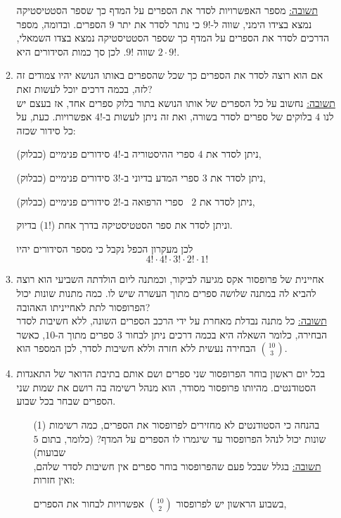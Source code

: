 \documentclass[12pt, a4paper]{article}
\begin{document}
\begin{enumerate}
\begin{enumerate}
\underline{תשובה:}
מספר האפשרויות לסדר את הספרים על המדף כך שספר הסטטיסטיקה נמצא בצידו הימני, שווה ל-$9!$
כי נותר לסדר את יתר 
$9$
הספרים.
ובדומה, מספר הדרכים לסדר את הספרים על המדף כך שספר הסטטיסטיקה נמצא בצדו השמאלי, שווה
$9!$.
לכן סך כמות הסידורים היא
$\boxed{2\cdot 9!}$.
\\
\item
אם הוא רוצה לסדר את הספרים כך שכל שהספרים באותו הנושא יהיו צמודים זה לזה, בכמה דרכים יוכל לעשות זאת?
\\

\underline{תשובה:}
נחשוב על כל הספרים של אותו הנושא בתור בלוק ספרים אחד, אז בעצם יש לנו 
$4$
בלוקים של ספרים לסדר בשורה, ואת זה ניתן לעשות ב-$4!$
אפשרויות.
כעת, על כל סידור שכזה: 

ניתן לסדר את
$4$
ספרי ההיסטוריה ב-$4!$
סידורים פנימיים (כבלוק),

ניתן לסדר את
$3$
ספרי המדע בדיוני ב-$3!$
סידורים פנימיים (כבלוק),

ניתן לסדר את
$2$
 ספרי הרפואה ב-$2!$
 סידורים פנימיים (כבלוק),
 
 וניתן לסדר את ספר הסטטיסטיקה בדרך אחת ($1!$) בדיוק.

 לכן מעקרון הכפל נקבל כי מספר הסידורים יהיו
 $$\boxed{4! \cdot 4!\cdot 3!\cdot 2!\cdot 1!}$$
 
\item
אחיינית של פרופסור אקס מגיעה לביקור, וכמתנה ליום הולדתה השביעי הוא רוצה להביא לה במתנה
שלושה
ספרים מתוך העשרה שיש לו. כמה מתנות שונות יכול הפרופסור לתת לאחייניתו האהובה?
\\

\underline{תשובה:}
כל מתנה נבדלת מאחרת על ידי הרכב הספרים השונה, ללא חשיבות לסדר הבחירה, כלומר השאלה היא בכמה דרכים ניתן לבחור
$3$
ספרים
מתוך ה-$10$,
כאשר הבחירה נעשית ללא חזרה וללא חשיבות לסדר, לכן המספר הוא
$\boxed{\binom{10}{3}}$.
\\
\item
בכל יום ראשון בוחר הפרופסור שני ספרים ושם אותם בתיבת הדואר של התאגדות הסטודנטים. 
מהיותו פרופסור מסודר, הוא מנהל רשימה בה רושם את שמות שני הספרים שבחר בכל שבוע.
\begin{enumerate}
\item[(1)]
בהנחה כי הסטודנטים לא  מחזירים לפרופסור את הספרים,
כמה רשימות שונות יכול לנהל הפרופסור עד שיגמרו לו הספרים על המדף? (כלומר, בתום 
$5$
שבועות)
\\

\underline{תשובה:}
בגלל שבכל פעם שהפרופסור בוחר ספרים אין
חשיבות לסדר שלהם, ואין חזרות:

בשבוע הראשון יש לפרופסור
$\binom{10}{2}$
אפשרויות לבחור את הספרים,


\end{enumerate}
\end{enumerate}
\end{enumerate}
\end{document}
